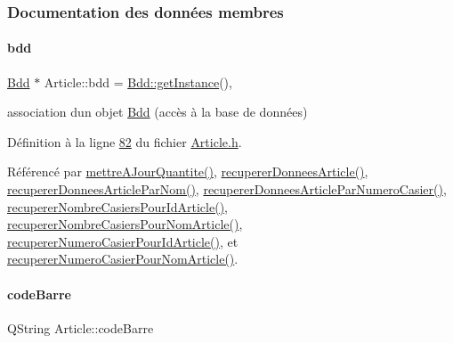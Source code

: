 \subsubsection{Documentation des données membres}
\mbox{\label{class_article_a7221cec4212d86d74f479b9ee683ee8a}} 
\paragraph{\texorpdfstring{bdd}{bdd}}
{\footnotesize\ttfamily \hyperlink{class_bdd}{Bdd} $\ast$ Article\+::bdd = \hyperlink{class_bdd_a6f55c29d593da12ca31fad02f5adfe24}{Bdd\+::get\+Instance}()\hspace{0.3cm}{\ttfamily [static]}, {\ttfamily [private]}}



association d\textquotesingle{}un objet \hyperlink{class_bdd}{Bdd} (accès à la base de données) 



Définition à la ligne \hyperlink{_article_8h_source_l00082}{82} du fichier \hyperlink{_article_8h_source}{Article.\+h}.



Référencé par \hyperlink{_article_8cpp_source_l00329}{mettre\+A\+Jour\+Quantite()}, \hyperlink{_article_8cpp_source_l00050}{recuperer\+Donnees\+Article()}, \hyperlink{_article_8cpp_source_l00103}{recuperer\+Donnees\+Article\+Par\+Nom()}, \hyperlink{_article_8cpp_source_l00156}{recuperer\+Donnees\+Article\+Par\+Numero\+Casier()}, \hyperlink{_article_8cpp_source_l00202}{recuperer\+Nombre\+Casiers\+Pour\+Id\+Article()}, \hyperlink{_article_8cpp_source_l00218}{recuperer\+Nombre\+Casiers\+Pour\+Nom\+Article()}, \hyperlink{_article_8cpp_source_l00234}{recuperer\+Numero\+Casier\+Pour\+Id\+Article()}, et \hyperlink{_article_8cpp_source_l00250}{recuperer\+Numero\+Casier\+Pour\+Nom\+Article()}.

\mbox{\label{class_article_a28db45ee4a48155c297be5c7c2eb54b9}} 
\paragraph{\texorpdfstring{code\+Barre}{codeBarre}}
{\footnotesize\ttfamily Q\+String Article\+::code\+Barre\hspace{0.3cm}{\ttfamily [private]}}




